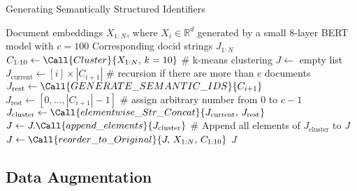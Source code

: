 \begin{algorithm}[H]
    \caption{Generating Semantically Structured Identifiers}
    \label{alg:semanticids}
    \begin{algorithmic}[1]
    \Require Document embeddings $X_{1:N}$, where $X_i \in \mathbb{R}^d$ generated by a small 8-layer BERT model with $c=100$
    \Ensure Corresponding docid strings $J_{1:N}$
        \State $C_{1:10} \gets \Call{Cluster}{X_{1:N},\, k=10}$ \# k-means clustering
        \State $J \gets$ empty list
            \State $J_{\text{current}} \gets [i] \times |C_{i+1}|$
             \# recursion if there are more than c documents
                \State $J_{\text{rest}} \gets \Call{GENERATE\_SEMANTIC\_IDS}{C_{i+1}}$
            \Else
                \State $J_{\text{rest}} \gets [0,\dots,|C_{i+1}| - 1]$ \# assign arbitrary number from 0 to $c-1$
            \EndIf
            \State $J_{\text{cluster}} \gets \Call{elementwise\_Str\_Concat}{J_{\text{current}},\,J_{\text{rest}}}$
            \State $J \gets J.\Call{append\_elements}{J_{\text{cluster}}}$ \# Append all elements of $J_{\text{cluster}}$ to $J$
        \EndFor
        \State $J \gets \Call{reorder\_to\_Original}{J,\,X_{1:N},\,C_{1:10}}$
        \State \Return $J$
    \EndFunction
    \end{algorithmic}
    \end{algorithm}
\subsection{Data Augmentation}